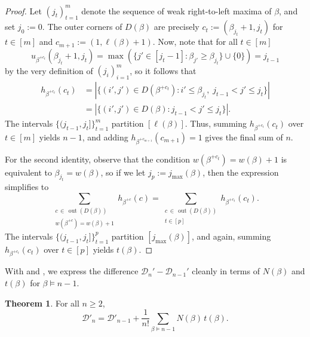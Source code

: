 \documentclass[12pt]{amsart}
\DeclareMathOperator{\out}{out}
\theoremstyle{definition}
\newtheorem{theorem}{Theorem}[section]
\begin{document}
\begin{proof}
Let $(j_t)_{t=1}^m$ denote the sequence of weak right-to-left maxima of $\beta$, and set $j_0:=0$. The outer corners of $D(\beta)$ are precisely $c_t:=(\beta_{j_t}+1,j_t)$ for $t\in[m]$ and $c_{m+1}:=(1,\ell(\beta)+1)$. Now, note that for all $t\in [m]$
\[u_{\beta^{+c_t}}(\beta_{j_t}+1,j_t) = \max\left(\{j'\in [j_t-1]:\beta_{j'}\ge \beta_{j_t}\}\cup\{0\}\right) = j_{t-1}\]
by the very definition of $(j_i)_{i=1}^m$, so it follows that
\begin{align*}
h_{\beta^{+c_t}}(c_t)&=|\{(i',j')\in D(\beta^{+c_t}):i'\le\beta_{j_t},\;j_{t-1}<j'\le j_t\}| \\
&=|\{(i',j')\in D(\beta):j_{t-1}<j'\le j_t\}|.
\end{align*}
The intervals $\{(j_{t-1},j_t]\}_{t=1}^m$ partition $[\ell(\beta)]$. Thus, summing $h_{\beta^{+c_t}}(c_t)$ over $t\in[m]$ yields $n-1$, and adding $h_{\beta^{+c_{m+1}}}(c_{m+1})=1$ gives the final sum of $n$.

For the second identity, observe that the condition $w(\beta^{+c_t})=w(\beta)+1$ is equivalent to $\beta_{j_t}=w(\beta)$, so if we let $j_p:=j_{\max}(\beta)$, then the expression simplifies to
\[\sum_{\substack{c\,\in\,\out(D(\beta)) \\ w(\beta^{+c})=w(\beta)+1}} h_{\beta^{+c}}(c) = \sum_{\substack{c\,\in\,\out(D(\beta)) \\ t\in [p]}} h_{\beta^{+c_{t}}}(c_t).\]
The intervals $\{(j_{t-1},j_t]\}_{t=1}^p$ partition $[j_{\max}(\beta)]$, and again,  summing $h_{\beta^{+c_t}}(c_t)$ over $t\in[p]$ yields $t(\beta)$.
\end{proof}

With  and , we express the difference $\mathcal{D}_n' - \mathcal{D}_{n-1}'$ cleanly in terms of $N(\beta)$ and $t(\beta)$ for $\beta\models n-1$.
\begin{theorem}\label{thm:increment}
For all $n\ge2$,
\[\mathcal{D}'_n = \mathcal{D}'_{n-1} + \frac{1}{n!}\sum_{\beta\models n-1} N(\beta)\,t(\beta).\]
\end{theorem}
\end{document}
